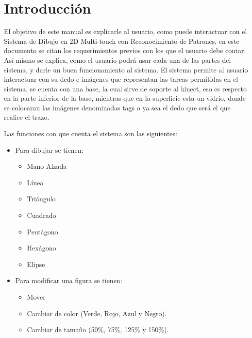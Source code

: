 \documentclass{book}
\begin{document}
\chapter{Introducción}

El objetivo de este manual es explicarle al usuario, como puede interactuar con el Sistema de Dibujo en 2D  Multi-touch con Reconocimiento de Patrones, en este documento se citan los requerimientos previos  con los que el usuario debe contar. Así mismo se explica, como el usuario podrá usar cada una de las partes del sistema, y darle un buen funcionamiento al sistema.
El sistema permite al usuario interactuar con su dedo e imágenes que representan las tareas permitidas en el sistema, se cuenta con una base, la cual sirve de soporte al kinect, eso es respecto en la parte inferior de la base, mientras que en la superficie esta un vidrio, donde se colocaran las imágenes denominadas tags o ya sea el dedo que será el que realice el trazo.

Las funciones con que cuenta el sistema son las siguientes:

\begin{itemize}
\item Para dibujar se tienen:

 \begin{itemize}
  \item Mano Alzada
  \item Línea
  \item Triángulo
  \item Cuadrado
  \item Pentágono
  \item Hexágono
  \item Elipse
 \end{itemize}

\item Para modificar una figura se tienen:
  \begin{itemize}
    \item Mover
    \item Cambiar  de color (Verde, Rojo, Azul y Negro).
    \item Cambiar de tamaño (50\%, 75\%, 125\% y 150\%).
  \end{itemize}

\end{itemize}
\end{document}
